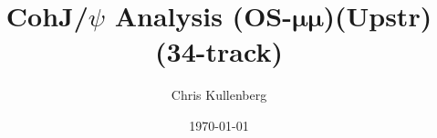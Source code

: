 \title{CohJ/$\psi$ Analysis (\textbf{OS}-$\boldsymbol{\mu\mu}$)(\textbf{Upstr})(\textbf{34-track})}
\author{Chris Kullenberg}
\date{\today}
